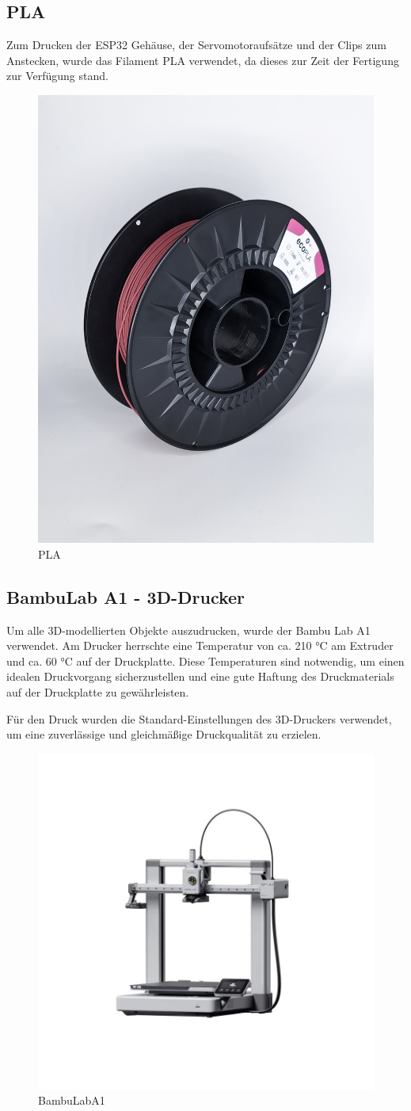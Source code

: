 \newpage
\subsection{PLA}
Zum Drucken der ESP32 Gehäuse, der Servomotoraufsätze und der Clips zum Anstecken, wurde das Filament PLA verwendet, da dieses zur Zeit der Fertigung zur Verfügung stand.

\begin{figure}[H]
	\centering
	\includegraphics[width=0.4\linewidth]{images/PLA.jpg}
	\caption[PLA]{PLA}
	\label{fig:PLA} 
\end{figure}

\newpage
\subsection{BambuLab A1 - 3D-Drucker}
Um alle 3D-modellierten Objekte auszudrucken, wurde der Bambu Lab A1 verwendet. Am Drucker herrschte eine Temperatur von ca. 210 °C am Extruder und ca. 60 °C auf der Druckplatte. Diese Temperaturen sind notwendig, um einen idealen Druckvorgang sicherzustellen und eine gute Haftung des Druckmaterials auf der Druckplatte zu gewährleisten.  

Für den Druck wurden die Standard-Einstellungen des 3D-Druckers verwendet, um eine zuverlässige und gleichmäßige Druckqualität zu erzielen.

\begin{figure}[H]
	\centering
	\includegraphics[width=0.6\linewidth]{images/BambuLabA1.jpg}
	\caption[BambuLabA1]{BambuLabA1}
	\label{fig: BambuLabA1}
\end{figure}

